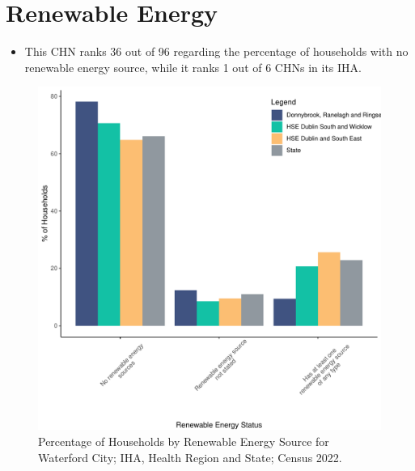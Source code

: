 \documentclass{article}
\begin{document}
\section{Renewable Energy}\label{sect:RE}
\begin{itemize}
\item This CHN ranks  36 out of 96 regarding the percentage of households with no renewable energy source, while it ranks   1 out of 6 CHNs in its IHA.
\end{itemize}
\begin{figure}[H]
	\centering
	\includegraphics[width = 140mm]{../figures/RenewableEnergyED.pdf}
	\caption{Percentage of Households by Renewable Energy Source for Waterford City; IHA, Health Region and State; Census 2022.}
	\label{fig:vbnv}
	\end{figure}
\end{document}
